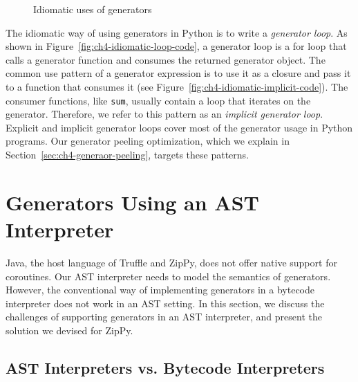 \begin{figure}[h]
\centering
{}
\caption{Idiomatic uses of generators}
\label{fig:ch4-idiomatic-patterns}
\end{figure}

The idiomatic way of using generators in Python is to write a \emph{generator loop}.
As shown in Figure~\ref{fig:ch4-idiomatic-loop-code}, a generator loop is a for loop that calls a generator function and consumes the returned generator object.
The common use pattern of a generator expression is to use it as a closure and pass it to a function that consumes it (see Figure~\ref{fig:ch4-idiomatic-implicit-code}).
The consumer functions, like \texttt{sum}, usually contain a loop that iterates on the generator.
Therefore, we refer to this pattern as an \emph{implicit generator loop}.
Explicit and implicit generator loops cover most of the generator usage in Python programs.
Our generator peeling optimization, which we explain in Section~\ref{sec:ch4-generaor-peeling}, targets these patterns.

\section{Generators Using an AST Interpreter}

Java, the host language of Truffle and ZipPy, does not offer native support for coroutines.
Our AST interpreter needs to model the semantics of generators.
However, the conventional way of implementing generators in a bytecode interpreter does not work in an AST setting.
In this section, we discuss the challenges of supporting generators in an AST interpreter, and present the solution we devised for ZipPy.

\subsection{AST Interpreters vs. Bytecode Interpreters}

